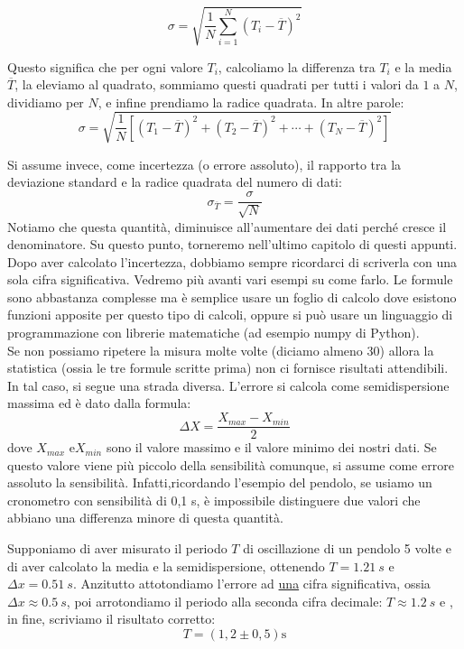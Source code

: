 \documentclass[12pt,a4paper,oneside]{book}
\theoremstyle{esercizio}
\begin{document}
\[
\sigma = \sqrt{\frac{1}{N} \sum_{i=1}^{N} (T_i - \overline{T})^2}
\]

\noindent
Questo significa che per ogni valore $T_i$, calcoliamo la differenza tra $T_i$ e la media $\overline{T}$, la eleviamo al quadrato, sommiamo questi quadrati per tutti i valori da $1$ a $N$, dividiamo per $N$, e infine prendiamo la radice quadrata. In altre parole:
\[
\sigma = \sqrt{\frac{1}{N} \left[ (T_1 - \overline{T})^2 + (T_2 - \overline{T})^2 + \cdots + (T_N - \overline{T})^2 \right]}
\]

Si assume invece, come incertezza (o errore assoluto), il rapporto tra la deviazione standard e la radice quadrata del numero di dati:
\[
\sigma_{\overline{T}}=\frac{\sigma}{\sqrt{N}}
\] 
Notiamo che questa quantità, diminuisce all'aumentare dei dati perché cresce il denominatore. Su questo punto, torneremo nell'ultimo capitolo di questi appunti.
Dopo aver calcolato l'incertezza, dobbiamo sempre ricordarci di scriverla con una sola cifra significativa. Vedremo più avanti vari esempi su come farlo. Le formule sono abbastanza complesse ma è semplice usare un foglio di calcolo dove esistono funzioni apposite per questo tipo di calcoli, oppure si può usare un linguaggio di programmazione con librerie matematiche (ad esempio numpy di Python). \\

Se non possiamo ripetere la misura molte volte (diciamo almeno 30) allora la statistica (ossia le tre formule scritte prima) non ci fornisce risultati attendibili. In tal caso, si segue una strada diversa. L'errore si calcola come semidispersione massima ed è dato dalla formula:
\[
\Delta X = \frac{X_{max}-X_{min}}{2}
\]
dove $X_{max}$  e$X_{min}$ sono il valore massimo e  il valore minimo dei nostri dati. Se questo valore viene più piccolo della sensibilità comunque, si assume come errore assoluto la sensibilità. Infatti,ricordando l'esempio del pendolo, se usiamo un cronometro con sensibilità di 0,1 s, è impossibile distinguere due valori che abbiano una differenza minore di questa quantità. 

Supponiamo di aver misurato il periodo $T$ di oscillazione di un pendolo 5 volte e di aver calcolato la media e la semidispersione, ottenendo $T=\SI{1,21}{s}$ e $\Delta x = \SI{0,51}{s}$. Anzitutto attotondiamo l'errore ad \underline{una} cifra significativa, ossia $\Delta x \approx \SI{0,5}{s}$, poi arrotondiamo il periodo alla seconda cifra decimale: $T\approx \SI{1,2}{s}$ e , in fine, scriviamo il risultato corretto:
\[
T=\left(1,2 \pm 0,5 \right)\si{\second}
\]  
\end{document}
